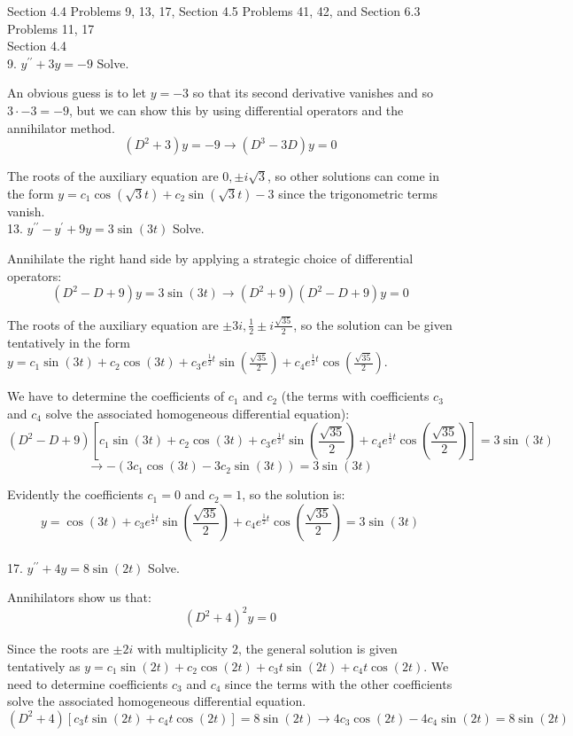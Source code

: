 \documentclass[11pt]{article}
\newcommand{\br}[1]{\left(#1\right)}
\newcommand{\sbr}[1]{\left[#1\right]}
\newcommand{\dprime}{\prime\prime}
\begin{document}
Section 4.4 Problems 9, 13, 17, Section 4.5 Problems 41, 42, and Section 6.3 Problems 11, 17\\

Section 4.4 \\

9. $y^{\dprime} + 3y = -9$ Solve.

An obvious guess is to let $y=-3$ so that its second derivative vanishes and so $3\cdot -3 = -9$, but we can show this by using differential operators and the annihilator method.
$$\br{D^2+3}y=-9\to \br{D^3-3D}y = 0$$

The roots of the auxiliary equation are $0,\pm i\sqrt{3}$, so other solutions can come in the form $y = c_1\cos(\sqrt{3}t) + c_2\sin(\sqrt{3}t) - 3$ since the trigonometric terms vanish. \\

13. $y^{\dprime} - y^{\prime} + 9y = 3\sin(3t)$ Solve.

Annihilate the right hand side by applying a strategic choice of differential operators:
$$\br{D^2-D+9}y = 3\sin(3t) \to \br{D^2+9}\br{D^2-D+9}y = 0$$

The roots of the auxiliary equation are $\pm 3i, \frac{1}{2}\pm i\frac{\sqrt{35}}{2}$, so the solution can be given tentatively in the form $y = c_1\sin(3t) + c_2\cos(3t) + c_3e^{\frac{1}{2}t}\sin(\frac{\sqrt{35}}{2}) + c_4e^{\frac{1}{2}t}\cos(\frac{\sqrt{35}}{2})$. 

We have to determine the coefficients of $c_1$ and $c_2$ (the terms with coefficients $c_3$ and $c_4$ solve the associated homogeneous differential equation):
$$\br{D^2-D+9}\sbr{c_1\sin(3t) + c_2\cos(3t) + c_3e^{\frac{1}{2}t}\sin(\frac{\sqrt{35}}{2}) + c_4e^{\frac{1}{2}t}\cos(\frac{\sqrt{35}}{2})} =3\sin(3t)$$
$$\to -\br{3c_1\cos(3t)-3c_2\sin(3t)} = 3\sin(3t)$$

Evidently the coefficients $c_1 = 0$ and $c_2 = 1$, so the solution is:
$$y = \cos(3t) + c_3e^{\frac{1}{2}t}\sin(\frac{\sqrt{35}}{2}) + c_4e^{\frac{1}{2}t}\cos(\frac{\sqrt{35}}{2}) = 3\sin(3t)$$ \\

17. $y^{\dprime} + 4y = 8\sin(2t)$ Solve.

Annihilators show us that:
$$\br{D^2+4}^2 y = 0$$

Since the roots are $\pm 2i$ with multiplicity $2$, the general solution is given tentatively as $y = c_1\sin(2t) + c_2\cos(2t) + c_3t\sin(2t) + c_4t\cos(2t)$. We need to determine coefficients $c_3$ and $c_4$ since the terms with the other coefficients solve the associated homogeneous differential equation.
$$\br{D^2+4}\sbr{c_3t\sin(2t) + c_4t\cos(2t)} = 8\sin(2t) \to 4c_3\cos(2t) - 4c_4\sin(2t) = 8\sin(2t)$$
\end{document}

